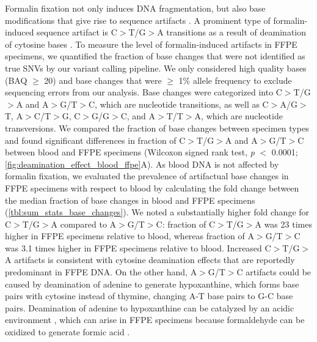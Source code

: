 Formalin fixation not only induces DNA fragmentation, but also base modifications that give rise to sequence artifacts \cite{Do2012, Do2013, Do2015a, Kim2017, Hofreiter2001, Wong2014, Ofner2017, Oh2015}. A prominent type of formalin-induced sequence artifact is C$>$T/G$>$A transitions as a result of deamination of cytosine bases \cite{Do2015a, Kim2017, Wong2014, Oh2015, Lin2014}. To measure the level of formalin-induced artifacts in FFPE specimens, we quantified the fraction of base changes that were not identified as true SNVs by our variant calling pipeline. We only considered high quality bases (BAQ $\geq$ 20) and base changes that were $\geq$ 1\% allele frequency to exclude sequencing errors from our analysis. Base changes were categorized into C$>$T/G$>$A and A$>$G/T$>$C, which are nucleotide transitions, as well as C$>$A/G$>$T, A$>$C/T$>$G, C$>$G/G$>$C, and A$>$T/T$>$A, which are nucleotide transversions. We compared the fraction of base changes between specimen types and found significant differences in fraction of C$>$T/G$>$A and A$>$G/T$>$C between blood and FFPE specimens (Wilcoxon signed rank test, \textit{p} $<$ 0.0001; \autoref{fig:deamination_effect_blood_ffpe}A). As blood DNA is not affected by formalin fixation, we evaluated the prevalence of artifactual base changes in FFPE specimens with respect to blood by calculating the fold change between the median fraction of base changes in blood and FFPE specimens (\autoref{tbl:sum_stats_base_changes}). We noted a substantially higher fold change for C$>$T/G$>$A compared to A$>$G/T$>$C: fraction of C$>$T/G$>$A was 23 times higher in FFPE specimens relative to blood, whereas fraction of A$>$G/T$>$C was 3.1 times higher in FFPE specimens relative to blood. Increased C$>$T/G$>$A artifacts is consistent with cytosine deamination effects that are reportedly predominant in FFPE DNA. On the other hand, A$>$G/T$>$C artifacts could be caused by deamination of adenine to generate hypoxanthine, which forms base pairs with cytosine instead of thymine, changing A-T base pairs to G-C base pairs. Deamination of adenine to hypoxanthine can be catalyzed by an acidic environment \cite{Wang2010}, which can arise in FFPE specimens because formaldehyde can be oxidized to generate formic acid \cite{Do2015a}.


